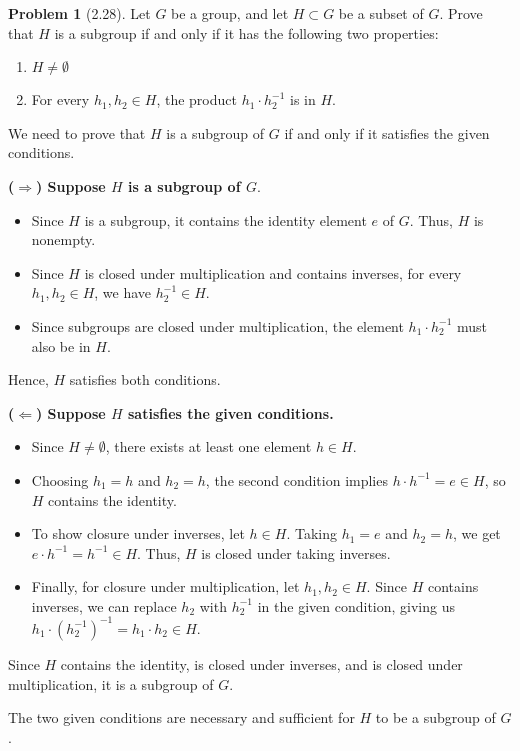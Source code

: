 \documentclass[12pt]{article}
\theoremstyle{definition}
\newtheorem{problem}{Problem}
\begin{document}
\begin{problem}[2.28]
    Let $G$ be a group, and let $H \subset G$ be a subset of $G$. Prove that $H$ is a subgroup if and only if it has the following two properties:
    \begin{enumerate}
        \item $H \neq \emptyset$
        \item For every $h_1, h_2 \in H$, the product $h_1 \cdot h_2^{-1}$ is in $H$.
    \end{enumerate}

    \begin{solution}
        We need to prove that $H$ is a subgroup of $G$ if and only if it satisfies the given conditions.

        \textbf{($\Rightarrow$) Suppose $H$ is a subgroup of $G$}.  
        \begin{itemize}
            \item Since $H$ is a subgroup, it contains the identity element $e$ of $G$. Thus, $H$ is nonempty.  
            \item Since $H$ is closed under multiplication and contains inverses, for every $h_1, h_2 \in H$, we have $h_2^{-1} \in H$.  
            \item Since subgroups are closed under multiplication, the element $h_1 \cdot h_2^{-1}$ must also be in $H$.  
        \end{itemize}
        Hence, $H$ satisfies both conditions.
    
        \textbf{($\Leftarrow$) Suppose $H$ satisfies the given conditions.}  
        \begin{itemize}
            \item Since $H \neq \emptyset$, there exists at least one element $h \in H$.  
            \item Choosing $h_1 = h$ and $h_2 = h$, the second condition implies $h \cdot h^{-1} = e \in H$, so $H$ contains the identity.  
            \item To show closure under inverses, let $h \in H$. Taking $h_1 = e$ and $h_2 = h$, we get $e \cdot h^{-1} = h^{-1} \in H$. Thus, $H$ is closed under taking inverses.  
            \item Finally, for closure under multiplication, let $h_1, h_2 \in H$. Since $H$ contains inverses, we can replace $h_2$ with $h_2^{-1}$ in the given condition, giving us $h_1 \cdot (h_2^{-1})^{-1} = h_1 \cdot h_2 \in H$.  
        \end{itemize}
        Since $H$ contains the identity, is closed under inverses, and is closed under multiplication, it is a subgroup of $G$.
    
        The two given conditions are necessary and sufficient for $H$ to be a subgroup of $G$.
        
    \end{solution}
\end{problem}
\end{document}
